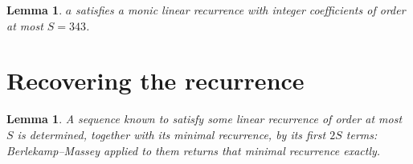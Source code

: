 \documentclass[11pt,a4paper]{article}
\theoremstyle{plain}
\newtheorem{lemma}[theorem]{Lemma}
\theoremstyle{definition}
\begin{document}
\begin{lemma}\label{lem:cf}
$a$ satisfies a monic linear recurrence with integer coefficients of order at most $S=343$.
\end{lemma}

\section{Recovering the recurrence}

\begin{lemma}\label{lem:bm}
A sequence known to satisfy some linear recurrence of order at most $S$ is determined, together
with its minimal recurrence, by its first $2S$ terms: Berlekamp--Massey applied to them returns
that minimal recurrence exactly.
\end{lemma}
\end{document}
